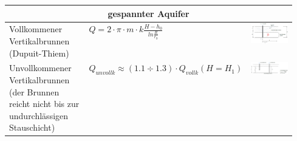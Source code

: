 \begin{minipage}{\linewidth}
\begin{tabular}{p{0.3\linewidth}|l|p{0.25\linewidth}}
		\multicolumn{3}{c|}{ \textbf{gespannter Aquifer} } \\ \hline
		
		Vollkommener Vertikalbrunnen (Dupuit-Thiem) & $ Q = 2 \cdot \pi \cdot m \cdot k \frac{H - h_0}{ln \frac{R}{r_0} } $	& \smallskip \includegraphics[width=0.8\linewidth]{images/GW10gespAquifer.PNG}  \\ \hline
		
		Unvollkommener Vertikalbrunnen (der Brunnen reicht nicht bis zur undurchlässigen Stauschicht)	& $ Q_{unvollk} \approx (1.1 \div 1.3) \cdot Q_{vollk} (H = H_1) $	& \smallskip \includegraphics[width=\linewidth]{images/GW11gespAquiferunvollk.PNG}  \\
		
	\end{tabular}
\end{minipage}
